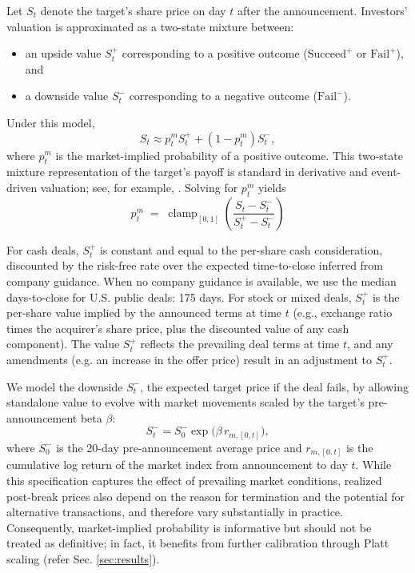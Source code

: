 \documentclass{article}
\theoremstyle{plain}
\theoremstyle{definition}
\theoremstyle{remark}
\newcommand{\SucceedPlus}{\boldsymbol{\mathrm{Succeed}^{+}}}
\newcommand{\FailPlus}{\boldsymbol{\mathrm{Fail}^{+}}}
\newcommand{\FailMinus}{\boldsymbol{\mathrm{Fail}^{-}}}
\begin{document}
Let $S_t$ denote the target’s share price on day $t$ after the announcement. Investors’ valuation is approximated as a two-state mixture between:
\begin{itemize}
    \item an upside value $S^+_t$ corresponding to a positive outcome ($\SucceedPlus$ or $\FailPlus$), and
    \item a downside value $S^-_t$ corresponding to a negative outcome ($\FailMinus$).
\end{itemize}
Under this model,
$$
S_t \approx p^m_t S^+_t + (1 - p^m_t) S^-_t,
$$
where $p^m_t$ is the market-implied probability of a positive outcome. 
This two-state mixture representation of the target’s payoff is standard in derivative and event-driven valuation; see, for example, \citet{hull2018options}.
Solving for $p^m_t$ yields
$$
p^m_t \;=\; \operatorname{clamp}_{[0,1]}\!\left(\frac{S_t - S^-_t}{S^+_t - S^-_t}\right)
$$


For cash deals, $S^+_t$ is constant and equal to the per-share cash consideration, discounted by the risk-free rate over the expected time-to-close inferred from company guidance. When no company guidance is available, we use the median days-to-close for U.S. public deals: 175 days. For stock or mixed deals, $S^+_t$ is the per-share value implied by the announced terms at time $t$ (e.g., exchange ratio times the acquirer’s share price, plus the discounted value of any cash component). The value $S^+_t$ reflects the prevailing deal terms at time $t$, and any amendments (e.g. an increase in the offer price) result in an adjustment to $S^+_t$. 


We model the downside $S^-_t$, the expected target price if the deal fails, by allowing standalone value to evolve with market movements scaled by the target’s pre-announcement beta $\beta$:
$$
S^-_t = S^-_0 \exp\bigl(\beta \, r_{m,[0,t]}\bigr),
$$
where $S^-_0$ is the 20-day pre-announcement average price and $r_{m,[0,t]}$ is the cumulative log return of the market index from announcement to day $t$. While this specification captures the effect of prevailing market conditions, realized post-break prices also depend on the reason for termination and the potential for alternative transactions, and therefore vary substantially in practice. Consequently, market-implied probability is informative but should not be treated as definitive; in fact, it benefits from further calibration through Platt scaling (refer Sec. \ref{sec:results}).
\end{document}
